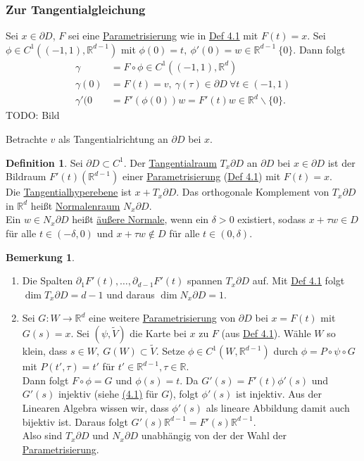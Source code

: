\documentclass[a4paper]{scrreprt}
\newcommand{\R}{\mathbb{R}}
\newcommand{\jlabel}[1]{\label{j_#1}}
\newcommand{\jterm}[1]{\jlabel{#1}\uline{#1}}
\newcommand{\jhyperref}[2]{\hyperref[j_#1]{#2}}
\newcommand{\jlink}[1]{\jhyperref{#1}{#1}}
\newcommand{\jabb}[3]{ #1: #2 \rightarrow #3 }
\newcommand{\jspace}{\vspace{8pt}}
\theoremstyle{plain}
\theoremstyle{definition}
\newtheorem{defn}[thm]{Definition}
\newtheorem{bem}[thm]{Bemerkung}
\begin{document}
{{{{\subsubsection*{Zur Tangentialgleichung}

Sei $x\in \partial D$, $F$ sei eine \jlink{Parametrisierung} wie in \jlink{Def 4.1} mit $F(t) = x$. Sei $\phi \in C^1((-1,1), \R^{d-1})$ mit $\phi(0) = t, \ \phi'(0) = w \in \R^{d-1} \ \{0\}$. Dann folgt
\[
    \begin{split}
        \gamma &= F \circ \phi \in C^1((-1,1), \R^d)\\
        \gamma(0) &= F(t) = v, \ \gamma(\tau) \in \partial D \ \forall t \in (-1,1)\\
        \gamma'(0 &= F'(\phi(0))w = F'(t)w \in \R^d \backslash \{0\}.
    \end{split}
\]
TODO: Bild

\jspace

Betrachte $v$ als Tangentialrichtung an $\partial D$ bei $x$.

\begin{defn}
    \jlabel{Def 4.4}
    Sei $\partial D \subset C^1$. Der \jterm{Tangentialraum} $T_x\partial D$ an $\partial D$ bei $x \in \partial D$ ist der Bildraum $F'(t)(\R^{d-1})$ einer \jlink{Parametrisierung} (\jlink{Def 4.1}) mit $F(t) = x$.\\
    Die \jterm{Tangentialhyperebene} ist $x + T_x\partial D$. Das orthogonale Komplement von $T_x\partial D$ in $\R^d$ heißt \jterm{Normalenraum} $N_x\partial D$.\\
    Ein $w \in N_x\partial D$ heißt \uline{äußere Normale}, wenn ein $\delta > 0$ existiert, sodass $x + \tau w \in D$ für alle $t\in (-\delta, 0)$ und $x + \tau w \notin D$ für alle $t\in (0, \delta)$.
\end{defn}

\jlabel{Bem 4.5}
\begin{bem}
    \begin{enumerate}
        \item Die Spalten $\partial_1 F'(t), \dots, \partial_{d-1} F'(t)$ spannen $T_x\partial D$ auf. Mit \jlink{Def 4.1} folgt $\dim T_x\partial D = d-1$ und daraus $\dim N_x\partial D = 1$.
        
        \item Sei $\jabb{G}{W}{\R^d}$ eine weitere \jlink{Parametrisierung} von $\partial D$ bei $x = F(t)$ mit $G(s) =x$. Sei $(\psi, \tilde{V})$ die Karte bei $x$ zu $F$ (aus \jlink{Def 4.1}). Wähle $W$ so klein, dass $s\in W,\ G(W) \subset \tilde{V}$. Setze $\phi \in C^1(W, \R^{d-1})$ durch $\phi = P \circ \psi \circ G$ mit $P(t', \tau)=t'$ für $t' \in \R^{d-1}, \tau\in \R$.\\
        Dann folgt $F \circ \phi = G$ und $\phi(s)=t$. Da $G'(s) = F'(t)\phi'(s)$ und $G'(s)$ injektiv (siehe \jlink{(4.1)} für $G$), folgt $\phi'(s)$ ist injektiv. Aus der Linearen Algebra wissen wir, dass $\phi'(s)$ als lineare Abbildung damit auch bijektiv ist. Daraus folgt $G'(s)\R^{d-1} = F'(s)\R^{d-1}$.\\
        Also sind $T_x\partial D$ und $N_x\partial D$ unabhängig von der der Wahl der \jlink{Parametrisierung}.
    \end{enumerate}
\end{bem}

}}}}
\end{document}
